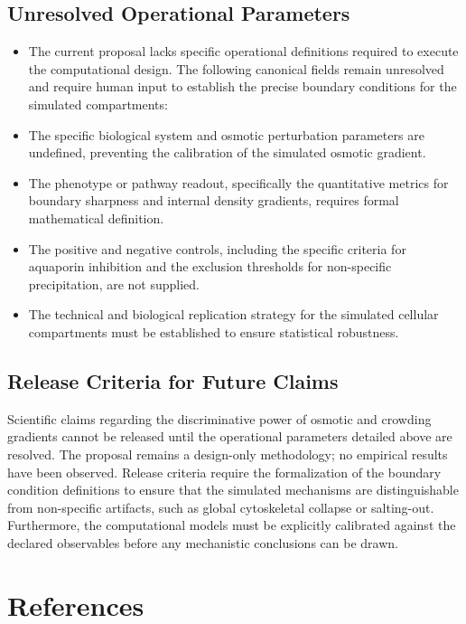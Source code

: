 \documentclass[conference]{IEEEtran}
\begin{document}
\subsection{Unresolved Operational Parameters}
\begin{itemize}
\item The current proposal lacks specific operational definitions required to execute the computational design. The following canonical fields remain unresolved and require human input to establish the precise boundary conditions for the simulated compartments:
\item The specific biological system and osmotic perturbation parameters are undefined, preventing the calibration of the simulated osmotic gradient.
\item The phenotype or pathway readout, specifically the quantitative metrics for boundary sharpness and internal density gradients, requires formal mathematical definition.
\item The positive and negative controls, including the specific criteria for aquaporin inhibition and the exclusion thresholds for non-specific precipitation, are not supplied.
\item The technical and biological replication strategy for the simulated cellular compartments must be established to ensure statistical robustness.
\end{itemize}

\subsection{Release Criteria for Future Claims}
Scientific claims regarding the discriminative power of osmotic and crowding gradients cannot be released until the operational parameters detailed above are resolved. The proposal remains a design-only methodology; no empirical results have been observed. Release criteria require the formalization of the boundary condition definitions to ensure that the simulated mechanisms are distinguishable from non-specific artifacts, such as global cytoskeletal collapse or salting-out. Furthermore, the computational models must be explicitly calibrated against the declared observables before any mechanistic conclusions can be drawn.\section*{References}


\end{document}
